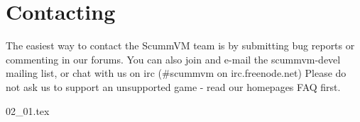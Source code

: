 


\section{Contacting}

The easiest way to contact the ScummVM team is by submitting bug reports or
commenting in our forums. You can also join and e-mail the scummvm-devel
mailing list, or chat with us on irc (\#scummvm on irc.freenode.net)
Please do not ask us to support an unsupported game - read our homepages
FAQ first.

 {02_01.tex}